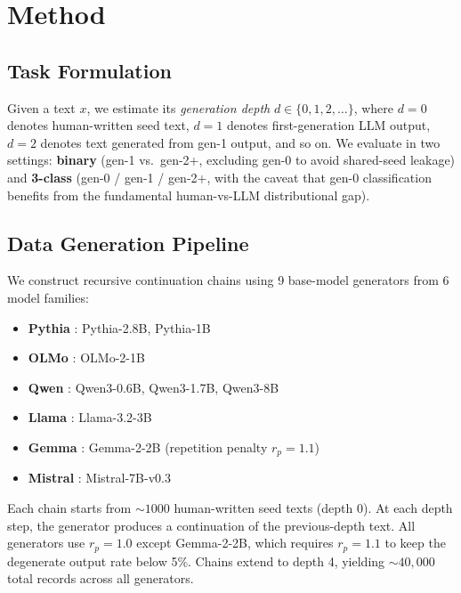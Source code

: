 \documentclass[11pt,a4paper]{article}
\begin{document}
\section{Method}

\subsection{Task Formulation}

Given a text $x$, we estimate its \emph{generation depth} $d \in \{0, 1, 2, \ldots\}$, where $d=0$ denotes human-written seed text, $d=1$ denotes first-generation LLM output, $d=2$ denotes text generated from gen-1 output, and so on. We evaluate in two settings: \textbf{binary} (gen-1 vs.\ gen-2+, excluding gen-0 to avoid shared-seed leakage) and \textbf{3-class} (gen-0 / gen-1 / gen-2+, with the caveat that gen-0 classification benefits from the fundamental human-vs-LLM distributional gap).

\subsection{Data Generation Pipeline}

We construct recursive continuation chains using 9 base-model generators from 6 model families:
\begin{itemize}
    \item \textbf{Pythia} \cite{biderman2023pythia}: Pythia-2.8B, Pythia-1B
    \item \textbf{OLMo} \cite{groeneveld2024olmo}: OLMo-2-1B
    \item \textbf{Qwen} \cite{yang2024qwen2}: Qwen3-0.6B, Qwen3-1.7B, Qwen3-8B
    \item \textbf{Llama} \cite{touvron2023llama}: Llama-3.2-3B
    \item \textbf{Gemma} \cite{team2024gemma}: Gemma-2-2B (repetition penalty $r_p = 1.1$)
    \item \textbf{Mistral} \cite{jiang2023mistral}: Mistral-7B-v0.3
\end{itemize}

Each chain starts from ${\sim}1000$ human-written seed texts (depth 0). At each depth step, the generator produces a continuation of the previous-depth text. All generators use $r_p = 1.0$ except Gemma-2-2B, which requires $r_p = 1.1$ to keep the degenerate output rate below 5\%. Chains extend to depth 4, yielding ${\sim}40{,}000$ total records across all generators.
\end{document}
